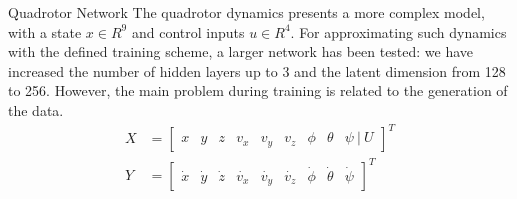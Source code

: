 \documentclass{beamer}
\begin{document}
\begin{frame}{Quadrotor Network}
    The quadrotor dynamics presents a more complex model, with a state $x \in R^9$ and control inputs $u \in R^4$. For approximating such dynamics with the defined training scheme, a larger network has been tested: we have increased the number of hidden layers up to 3 and the latent dimension from 128 to 256. However, the main problem during training is related to the generation of the data.
\begin{align}
    X &= \begin{bmatrix}x & y & z & v_x & v_y & v_z & \phi & \theta & \psi \ |\ U \end{bmatrix}^T \\
    Y &= \begin{bmatrix} \dot{x} & \dot{y} & \dot{z} & \dot{v_x} & \dot{v_y} & \dot{v_z} & \dot{\phi} & \dot{\theta} & \dot{\psi} \end{bmatrix}^T
\end{align}
\end{frame}
\end{document}
